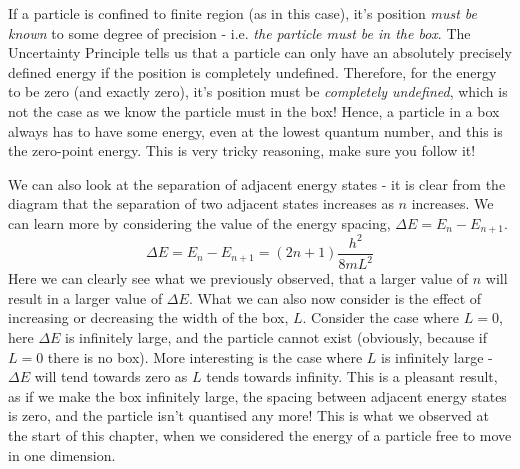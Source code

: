 \documentclass{memoir}[11pt,oneside,a4paper,openany]
\begin{document}
If a particle is confined to finite region (as in this case), it's position \emph{must be known} to some degree of precision - i.e. \emph{the particle must be in the box}. The Uncertainty Principle tells us that a particle can only have an absolutely precisely defined energy if the position is completely undefined. Therefore, for the energy to be zero (and exactly zero), it's position must be \emph{completely undefined}, which is not the case as we know the particle must in the box! Hence, a particle in a box always has to have some energy, even at the lowest quantum number, and this is the zero-point energy. This is very tricky reasoning, make sure you follow it!

We can also look at the separation of adjacent energy states - it is clear from the diagram that the separation of two adjacent states increases as $n$ increases. We can learn more by considering the value of the energy spacing, $\Delta E = E_n - E_{n+1}$.
\begin{equation}
	\Delta E  = E_n - E_{n+1} = (2n+1)\frac{h^2}{8mL^2}
\end{equation}
Here we can clearly see what we previously observed, that a larger value of $n$ will result in a larger value of $\Delta E$. What we can also now consider is the effect of increasing or decreasing the width of the box, $L$. Consider the case where $L = 0$, here $\Delta E$ is infinitely large, and the particle cannot exist (obviously, because if $L=0$ there is no box). More interesting is the case where $L$ is infinitely large - $\Delta E$ will tend towards zero as $L$ tends towards infinity. This is a pleasant result, as if we make the box infinitely large, the spacing between adjacent energy states is zero, and the particle isn't quantised any more! This is what we observed at the start of this chapter, when we considered the energy of a particle free to move in one dimension.
\end{document}
